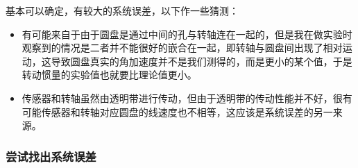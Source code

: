 \documentclass[dvipsnames, svgnames,a4paper,11pt]{article}
\begin{document}
\begin{enumerate}
		基本可以确定，有较大的系统误差，以下作一些猜测：
		\begin{itemize}
			\item 有可能来自于由于圆盘是通过中间的孔与转轴连在一起的，但是我在做实验时观察到的情况是二者并不能很好的嵌合在一起，即转轴与圆盘间出现了相对运动，这导致圆盘真实的角加速度并不是我们测得的，而是更小的某个值，于是转动惯量的实验值也就要比理论值更小。
			\item 传感器和转轴虽然由透明带进行传动，但由于透明带的传动性能并不好，很有可能传感器和转轴对应圆盘的线速度也不相等，这应该是系统误差的另一来源。
		\end{itemize}			
	\end{enumerate}
	
	\clearpage
	\subsubsection{尝试找出系统误差}
\end{document}
